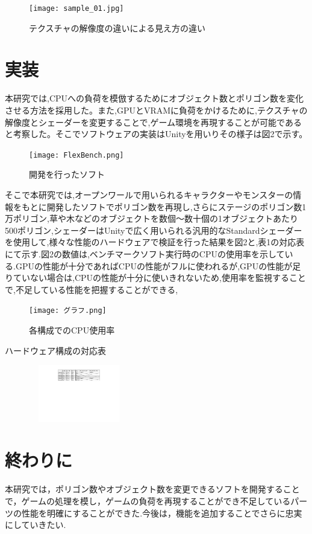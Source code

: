 \documentclass[twocolumn,10pt,a4j]{ltjsarticle}
\begin{document}
\begin{figure}[H]
\begin{center}
 \texttt{[image: sample\_01.jpg]}
\end{center}
 \caption{テクスチャの解像度の違いによる見え方の違い}
 \label{fig:図1}
\end{figure}
\vspace{-2mm}


\section{実装}
本研究では,CPUへの負荷を模倣するためにオブジェクト数とポリゴン数を変化させる方法を採用した。また,GPUとVRAMに負荷をかけるために,テクスチャの解像度とシェーダーを変更することで,ゲーム環境を再現することが可能であると考察した。そこでソフトウェアの実装はUnityを用いりその様子は図2で示す。

\vspace{1mm}
\begin{figure}[H]
\begin{center}
 \texttt{[image: FlexBench.png]}
\end{center}
 \caption{開発を行ったソフト}
 \label{fig:図1}
\end{figure}

そこで本研究では,オープンワールで用いられるキャラクターやモンスターの情報をもとに開発したソフトでポリゴン数を再現し,さらにステージのポリゴン数1万ポリゴン,草や木などのオブジェクトを数個～数十個の1オブジェクトあたり500ポリゴン,シェーダーはUnityで広く用いられる汎用的なStandardシェーダーを使用して,様々な性能のハードウェアで検証を行った結果を図2と,表1の対応表にて示す.図2の数値は,ベンチマークソフト実行時のCPUの使用率を示している.GPUの性能が十分であればCPUの性能がフルに使われるが,GPUの性能が足りていない場合は,CPUの性能が十分に使いきれないため,使用率を監視することで,不足している性能を把握することができる,

\vspace{1mm}
\begin{figure}[H]
\begin{center}
 \texttt{[image: グラフ.png]}
\end{center}
\vspace{-2mm}
 \caption{各構成でのCPU使用率}
 \label{fig:図1}
\end{figure}

\vspace{5mm}
\begin{table}[H]
\begin{center}
\caption{ハードウェア構成の対応表}
\vspace{2mm}
 \label{fig:教科書}
 \includegraphics[clip,width=65mm,height=25mm]{対応表.pdf}
\end{center}
\end{table}

\vspace{-5mm}
\section{終わりに}
\vspace{-1mm}
本研究では，ポリゴン数やオブジェクト数を変更できるソフトを開発することで，ゲームの処理を模し，ゲームの負荷を再現することができ不足しているパーツの性能を明確にすることができた.今後は，機能を追加することでさらに忠実にしていきたい.
\end{document}
